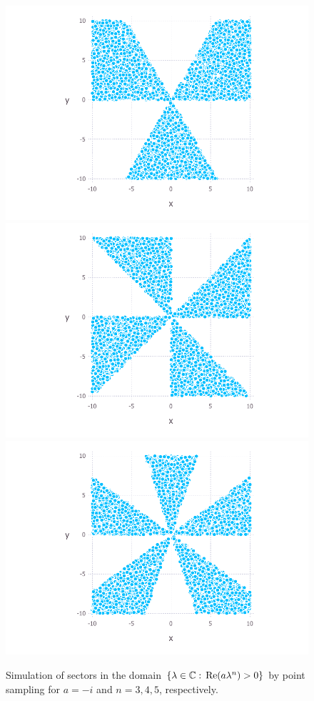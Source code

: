 \documentclass[11pt, oneside, a4paper]{article}
\begin{document}
\begin{figure}[htpb!]
      \includegraphics[width=\linewidth]{contourTracingPlot1.pdf}
    \endminipage\hfill
      \includegraphics[width=\linewidth]{contourTracingPlot2.pdf}
    \endminipage\hfill
      \includegraphics[width=\linewidth]{contourTracingPlot3.pdf}
    \endminipage
    \caption{Simulation of sectors in the domain $\{\lambda\in\mathbb C:\,\mathrm{Re}(a\lambda^n)>0\}$ by point sampling for $a=-i$ and $n=3, 4, 5$, respectively.}
    \label{fig:contourTracing}
\end{figure}
\end{document}

